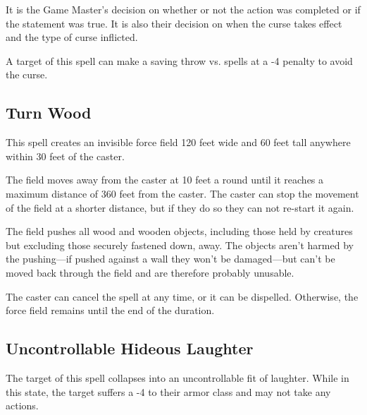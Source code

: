 \begin{multicols*}{2}
It is the Game Master's decision on whether or not the action was completed or if the statement was true. It is also their decision on when the curse takes effect and the type of curse inflicted.

A target of this spell can make a saving throw vs. spells at a -4 penalty to avoid the curse.

\subsection{Turn Wood}\label{spell:Turn Wood}

This spell creates an invisible force field 120 feet wide and 60 feet tall anywhere within 30 feet of the caster.

The field moves away from the caster at 10 feet a round until it reaches a maximum distance of 360 feet from the caster. The caster can stop the movement of the field at a shorter distance, but if they do so they can not re-start it again.

The field pushes all wood and wooden objects, including those held by creatures but excluding those securely fastened down, away. The objects aren’t harmed by the pushing—if pushed against a wall they won’t be damaged—but can’t be moved back through the field and are therefore probably unusable.

The caster can cancel the spell at any time, or it can be dispelled. Otherwise, the force field remains until the end of the duration.

\subsection{Uncontrollable Hideous Laughter}\label{spell:Uncontrollable Hideous Laughter}

The target of this spell collapses into an uncontrollable fit of laughter. While in this state, the target suffers a -4 to their armor class and may not take any actions.


\end{multicols*}
